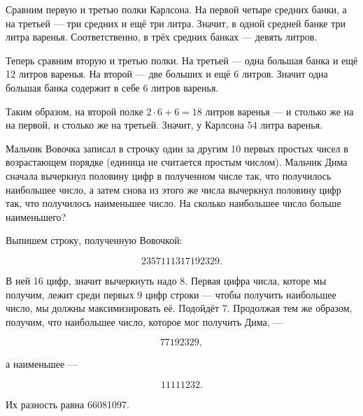 \begin{itemize}
\itr Сравним первую и третью полки Карлсона. На первой четыре средних банки, а на третьей — три средних и ещё три литра. Значит, в одной средней банке три литра варенья. Соответственно, в трёх средних банках — девять литров.

Теперь сравним вторую и третью полки. На третьей — одна большая банка и ещё 12 литров варенья. На второй — две больших и ещё 6 литров. Значит одна большая банка содержит в себе 6 литров варенья.

Таким образом, на второй полке $2 \cdot 6 + 6 = 18$ литров варенья — и столько же на на первой, и столько же на третьей. Значит, у Карлсона 54 литра варенья.
\bigbreak\noindent

\end{itemize}


\begin{itemize}

\itC Мальчик Вовочка записал в строчку один за другим 10 первых простых чисел в возрастающем порядке (единица не считается простым числом). Мальчик Дима сначала вычеркнул половину цифр в полученном числе так, что получилось наибольшее число, а затем снова из этого же числа вычеркнул половину цифр так, что получилось наименьшее число. На сколько наибольшее число больше наименьшего?

\itr Выпишем строку, полученную Вовочкой:

\vspace{-0.4cm}
$$2357111317192329.$$

В ней 16 цифр, значит вычеркнуть надо 8. Первая цифра числа, которе мы получим, лежит среди первых 9 цифр строки — чтобы получить наибольшее число, мы должны максимизировать её. Подойдёт 7. Продолжая тем же образом, получим, что наибольшее число, которое мог получить Дима, —

\vspace{-0.4cm}
$$77192329,$$

а наименьшее —

\vspace{-0.4cm}
$$11111232.$$

Их разность равна 66081097.

\end{itemize}



